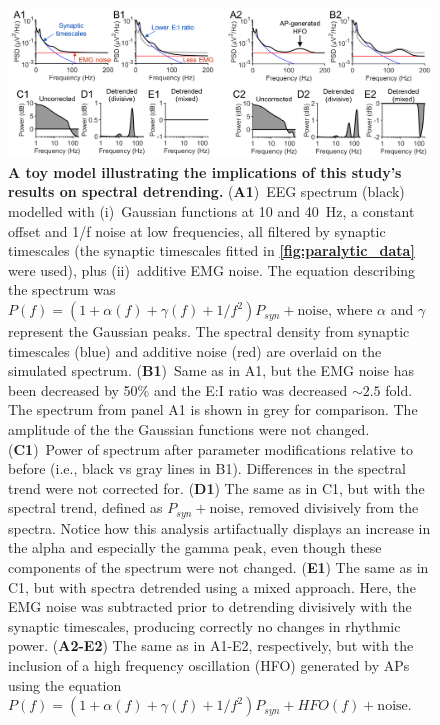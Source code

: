 \begin{figure}[t!]
    \centering
    \hspace*{-1.25cm}
    \includegraphics[width=18cm]{Figures/chapter3/figure7.png}
    \caption{\textbf{A toy model illustrating the implications of this study's results on spectral detrending.} (\textbf{A1})~EEG spectrum (black) modelled with (i)~Gaussian functions at 10 and 40~\unit{\hertz}, a constant offset and 1/f noise at low frequencies, all filtered by synaptic timescales (the synaptic timescales fitted in \textbf{\autoref{fig:paralytic_data}} were used), plus (ii)~additive EMG noise. The equation describing the spectrum was $P(f)=(1+\alpha(f)+\gamma(f)+1/f^2)P_{syn}+\mathrm{noise}$, where $\alpha$ and $\gamma$ represent the Gaussian peaks. The spectral density from synaptic timescales (blue) and additive noise (red) are overlaid on the simulated spectrum. (\textbf{B1})~Same as in A1, but the EMG noise has been decreased by 50\% and the E:I ratio was decreased ${\sim}2.5$ fold. The spectrum from panel A1 is shown in grey for comparison. The amplitude of the the Gaussian functions were not changed. (\textbf{C1})~Power of spectrum after parameter modifications relative to before (i.e., black vs gray lines in B1). Differences in the spectral trend were not corrected for. (\textbf{D1}) The same as in C1, but with the spectral trend, defined as $P_{syn}+\mathrm{noise}$, removed divisively from the spectra. Notice how this analysis artifactually displays an increase in the alpha and especially the gamma peak, even though these components of the spectrum were not changed. (\textbf{E1}) The same as in C1, but with spectra detrended using a mixed approach. Here, the EMG noise was subtracted prior to detrending divisively with the synaptic timescales, producing correctly no changes in rhythmic power. (\textbf{A2-E2}) The same as in A1-E2, respectively, but with the inclusion of a high frequency oscillation (HFO) generated by APs using the equation $P(f)=(1+\alpha(f)+\gamma(f)+1/f^2)P_{syn}+HFO(f)+\mathrm{noise}$.}
    \label{fig:detrending}
\end{figure}

